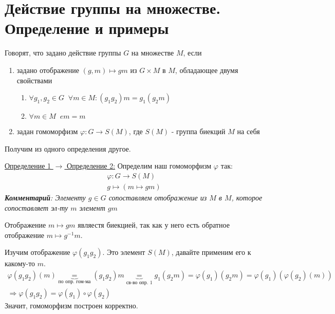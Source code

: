 \section{Действие группы на множестве. Определение и примеры}
\begin{conj}
    Говорят, что задано действие группы $G$ на множестве $M$, если
    \begin{enumerate}
        \item задано отображение $(g, m) \mapsto gm$ из  $G \times M$ в $M$, обладающее двумя свойствами
        \begin{enumerate}
            \item $\forall g_1, g_2 \in G \;\; \forall m \in M : (g_1g_2)m = g_1(g_2m)$ 
            
             \par
            \item $\forall m \in M \;\; em = m$
        \end{enumerate}
        \item задан гомоморфизм $\varphi: G \to S(M)$, где $S(M)$ - группа биекций $M$ на себя
    \end{enumerate}
\end{conj}
Получим из одного определения другое.

\underline{Определение 1 $\to$ Определение 2:} Определим наш гомоморфизм $\varphi$ так:
\begin{gather*}
    \varphi: G \to S(M) \\
    g \mapsto (m \mapsto gm)
\end{gather*} 
\textit{\textbf{Комментарий}: Элементу $g \in G$ сопоставляем отображение из $M$ в $M$, 
которое сопоставляет эл-ту $m$ элемент $gm$}

Отображение $m \mapsto gm$ являестя биекцией, так как у него есть обратное отображение $m \mapsto g^{-1}m$.

Изучим отображение $\varphi(g_1g_2)$. Это элемент $S(M)$, давайте применим его к какому-то $m$.
\begin{gather*}
    \varphi(g_1g_2)(m) \underbrace{=}_{\text{по опр. гом-ма}} (g_1g_2)m \underbrace{=}_{\text{св-во опр. 1}} g_1(g_2m) = \varphi(g_1)(g_2m) = \varphi(g_1)(\varphi(g_2)(m)) \\
    \Rightarrow \varphi(g_1g_2) = \varphi(g_1) \circ \varphi(g_2)
\end{gather*}
Значит, гомоморфизм построен корректно.

